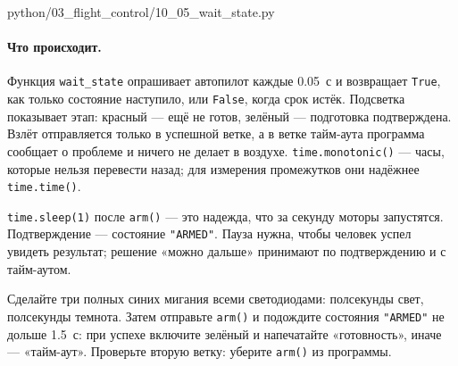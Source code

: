 \begin{codefile}[python]{python/03_flight_control/10_05_wait_state.py}
\end{codefile}

\paragraph{Что происходит.} Функция \verb|wait_state| опрашивает автопилот каждые 0.05~с и возвращает \verb|True|, как только состояние наступило, или \verb|False|, когда срок истёк. Подсветка показывает этап: красный --- ещё не готов, зелёный --- подготовка подтверждена. Взлёт отправляется только в успешной ветке, а в ветке тайм-аута программа сообщает о проблеме и ничего не делает в воздухе. \verb|time.monotonic()| --- часы, которые нельзя перевести назад; для измерения промежутков они надёжнее \verb|time.time()|.

\begin{rulebox}
\verb|time.sleep(1)| после \verb|arm()| --- это надежда, что за секунду моторы запустятся. Подтверждение --- состояние \verb|"ARMED"|. Пауза нужна, чтобы человек успел увидеть результат; решение «можно дальше» принимают по подтверждению и с тайм-аутом.
\end{rulebox}

\begin{taskbox}
Сделайте три полных синих мигания всеми светодиодами: полсекунды свет, полсекунды темнота. Затем отправьте \verb|arm()| и подождите состояния \verb|"ARMED"| не дольше 1.5~с: при успехе включите зелёный и напечатайте «готовность», иначе --- «тайм-аут». Проверьте вторую ветку: уберите \verb|arm()| из программы.
\end{taskbox}
